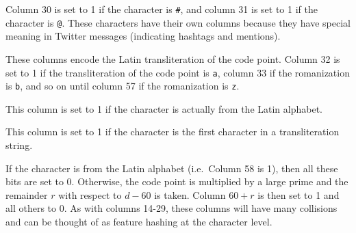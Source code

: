 \documentclass[sigconf,anonymous,review,10pt]{acmart}
\newcommand{\str}[1]{\texttt{#1}}
\begin{document}
\begin{description}
\begin{description}[font=\normalfont\itshape]
\item[Columns 30-31:]
    Column 30 is set to 1 if the character is \str{\#},
    and column 31 is set to 1 if the character is \str{@}.
    These characters have their own columns because they have special meaning in Twitter messages
    (indicating hashtags and mentions).

\item[Columns 32-57:]
    These columns encode the Latin transliteration of the code point.
    Column 32 is set to 1 if the transliteration of the code point is \str{a},
    column 33 if the romanization is \str{b},
    and so on until column 57 if the romanization is \str{z}.

\item[Column 58:]
    This column is set to 1 if the character is actually from the Latin alphabet.

\item[Column 59:]
    This column is set to 1 if the character is the first character in a transliteration string.

\item[Columns 60-$d$:]
    If the character is from the Latin alphabet (i.e.\ Column 58 is 1), 
    then all these bits are set to 0.
    Otherwise, the code point is multiplied by a large prime and the remainder $r$ with respect to $d-60$ is taken.
    Column $60+r$ is then set to 1 and all others to 0.
    As with columns 14-29,
    these columns will have many collisions and can be thought of as feature hashing \citep{weinberger2009feature} at the character level.
\end{description}


\end{description}
\end{document}
